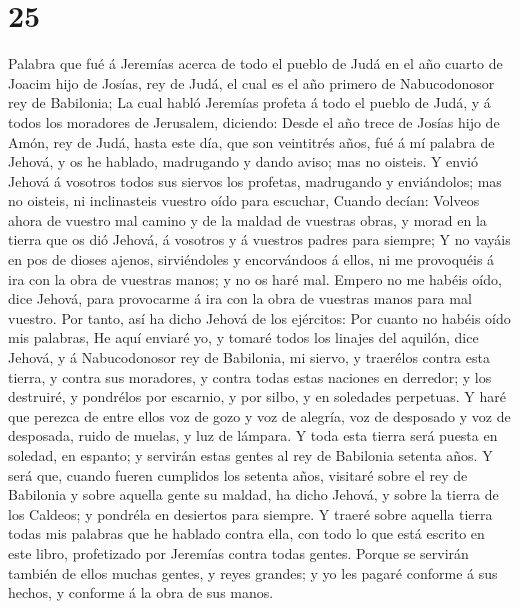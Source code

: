 \hypertarget{section-24}{%
\section{25}\label{section-24}}

 Palabra que fué á Jeremías acerca de todo el pueblo de Judá
en el año cuarto de Joacim hijo de Josías, rey de Judá, el cual es el
año primero de Nabucodonosor rey de Babilonia;  La cual
habló Jeremías profeta á todo el pueblo de Judá, y á todos los moradores
de Jerusalem, diciendo:  Desde el año trece de Josías hijo
de Amón, rey de Judá, hasta este día, que son veintitrés años, fué á mí
palabra de Jehová, y os he hablado, madrugando y dando aviso; mas no
oisteis.  Y envió Jehová á vosotros todos sus siervos los
profetas, madrugando y enviándolos; mas no oisteis, ni inclinasteis
vuestro oído para escuchar,  Cuando decían: Volveos ahora de
vuestro mal camino y de la maldad de vuestras obras, y morad en la
tierra que os dió Jehová, á vosotros y á vuestros padres para siempre;
 Y no vayáis en pos de dioses ajenos, sirviéndoles y
encorvándoos á ellos, ni me provoquéis á ira con la obra de vuestras
manos; y no os haré mal.  Empero no me habéis oído, dice
Jehová, para provocarme á ira con la obra de vuestras manos para mal
vuestro.  Por tanto, así ha dicho Jehová de los ejércitos:
Por cuanto no habéis oído mis palabras,  He aquí enviaré yo,
y tomaré todos los linajes del aquilón, dice Jehová, y á Nabucodonosor
rey de Babilonia, mi siervo, y traerélos contra esta tierra, y contra
sus moradores, y contra todas estas naciones en derredor; y los
destruiré, y pondrélos por escarnio, y por silbo, y en soledades
perpetuas.  Y haré que perezca de entre ellos voz de gozo y
voz de alegría, voz de desposado y voz de desposada, ruido de muelas, y
luz de lámpara.  Y toda esta tierra será puesta en soledad,
en espanto; y servirán estas gentes al rey de Babilonia setenta años.
 Y será que, cuando fueren cumplidos los setenta años,
visitaré sobre el rey de Babilonia y sobre aquella gente su maldad, ha
dicho Jehová, y sobre la tierra de los Caldeos; y pondréla en desiertos
para siempre.  Y traeré sobre aquella tierra todas mis
palabras que he hablado contra ella, con todo lo que está escrito en
este libro, profetizado por Jeremías contra todas gentes. 
Porque se servirán también de ellos muchas gentes, y reyes grandes; y yo
les pagaré conforme á sus hechos, y conforme á la obra de sus manos.
